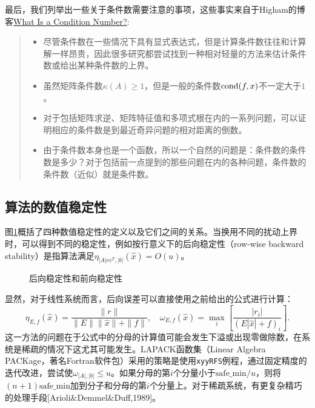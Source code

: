 \documentclass[a4paper,10pt]{ctexart}
\begin{document}
最后，我们列举出一些关于条件数需要注意的事项，这些事实来自于Higham的博客\href{https://nhigham.com/2020/03/19/what-is-a-condition-number/}{What Is a Condition Number?}:
\begin{quote}
    \begin{itemize}
        \item 尽管条件数在一些情况下具有显式表达式，但是计算条件数往往和计算解一样昂贵，因此很多研究都尝试找到一种相对轻量的方法来估计条件数或给出某种条件数的上界。
        \item 虽然矩阵条件数$ \kappa(A)\geqslant 1 $，但是一般的条件数$ {\rm cond}(f,x) $不一定大于$ 1 $。
        \item 对于包括矩阵求逆、矩阵特征值和多项式根在内的一系列问题，可以证明相应的条件数是到最近奇异问题的相对距离的倒数。
        \item 由于条件数本身也是一个函数，所以一个自然的问题是：条件数的条件数是多少？对于包括前一点提到的那些问题在内的各种问题，条件数的条件数（近似）就是条件数。
    \end{itemize}
\end{quote}

\subsection{算法的数值稳定性}
图\ref{fig:stability}概括了四种数值稳定性的定义以及它们之间的关系。当换用不同的扰动上界时，可以得到不同的稳定性，例如按行意义下的后向稳定性（row-wise backward stability）是指算法满足$ \eta_{|A|ee^T,|b|}(\hat{x}) = O(u) $。
\begin{figure}[htpb]
    \centering
    \caption{后向稳定性和前向稳定性}
    \label{fig:stability}
\end{figure}

显然，对于线性系统而言，后向误差可以直接使用之前给出的公式进行计算：
\[
    \eta_{E,f}(\hat{x}) = \frac{\| r \|}{\| E \| \| \hat{x} \| +\| f \| },\quad
    \omega_{E,f}(\hat{x}) = \max_i \left[ \frac{|r_i|}{(E|\hat{x}|+f)_i} \right].
\]
这一方法的问题在于公式中的分母的计算值可能会发生下溢或出现零做除数，在系统是稀疏的情况下这尤其可能发生。LAPACK函数集（Linear Algebra PACKage，著名Fortran软件包）采用的策略是使用\verb|xyyRFS|例程，通过固定精度的迭代改进，尝试使$\omega_{|A|,|b|}\leqslant u$。如果分母的第$i$个分量小于$\text{safe\_min}/u$，则将$(n+1)\text{safe\_min}$加到分子和分母的第$i$个分量上。对于稀疏系统，有更复杂精巧的处理手段[Arioli\&Demmel\&Duff,1989]。
\end{document}
